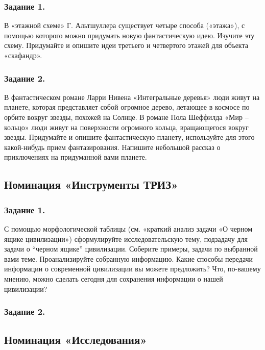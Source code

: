 \documentclass[11pt,a4paper]{article}
\begin{document}
\subsubsection*{Задание 1.}
В «этажной схеме» Г. Альтшуллера существует четыре способа («этажа»), с
помощью которого можно придумать новую фантастическую идею. Изучите эту схему.
Придумайте и опишите идеи третьего и четвертого этажей для объекта «скафандр».

\subsubsection*{Задание 2.}
В фантастическом романе Ларри Нивена «Интегральные деревья» люди живут на
планете, которая представляет собой огромное дерево, летающее в космосе по
орбите вокруг звезды, похожей на Солнце. В романе Пола Шеффилда «Мир – кольцо»
люди живут на поверхности огромного кольца, вращающегося вокруг звезды.
Придумайте и опишите фантастическую планету, используйте для этого
какой-нибудь прием фантазирования. Напишите небольшой рассказ о приключениях
на придуманной вами планете.

\subsection{Номинация «Инструменты ТРИЗ»}

\newcommand{\BlackBox}{С помощью морфологической таблицы (см. «краткий анализ
  задачи «О черном ящике цивилизации») сформулируйте исследовательскую тему,
  подзадачу для задачи о “черном ящике” цивилизации. Соберите примеры, задачи
  по выбранной вами теме. Проанализируйте собранную информацию. Какие способы
  передачи информации о современной цивилизации вы можете предложить? Что,
  по-вашему мнению, можно сделать сегодня для сохранения информации о нашей
  цивилизации?}

\subsubsection*{Задание 1.}\BlackBox
\subsubsection*{Задание 2.}\CosmicInventions

\subsection{Номинация «Исследования»}
\end{document}
